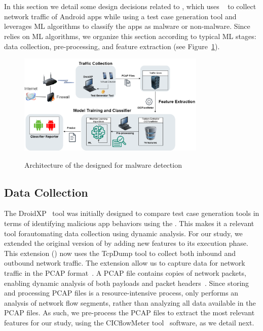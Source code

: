 \section{\droidxpflow}\label{sec:droidxpflow}

In this section we detail some design decisions
related to \droidxpflow, which uses \droidxp~\cite{DBLP:conf/scam/CostaMCMVBC20} to
collect network traffic of Android apps while
using a test case generation tool and leverages
ML algorithms to classify the
apps as malware or non-malware. Since \droidxpflow
relies on ML algorithms, we organize this section
according to typical ML stages: data collection,
pre-processing, and 
feature extraction (see Figure~\ref{fig:arq}).


\begin{figure}[h]
  \centering
  
    \includegraphics[width=0.80\textwidth]{image/archic.png} \\[\abovecaptionskip]
    
  \caption{Architecture of the \droidxpflow designed for malware detection}\label{fig:arq}
\end{figure}

\subsection{Data Collection}

The DroidXP~\cite{DBLP:conf/scam/CostaMCMVBC20} tool was initially designed to compare test case generation tools in terms of identifying malicious app behaviors using the \mas. This makes it a relevant tool forautomating data collection using dynamic analysis. For our study, we extended the original version of \droidxp by adding new features to its execution phase. This extension (\droidxpflow) now uses the TcpDump tool
to collect both inbound and outbound network traffic. The \droidxpflow extension allow us to capture data for network traffic in the PCAP format~\cite{DBLP:conf/iv/UhlarHR21}.
A PCAP file contains copies of network packets, enabling dynamic analysis of both payloads and packet headers~\cite{DBLP:conf/iv/UhlarHR21}. Since storing
and processing PCAP files is a resource-intensive process, \droidxpflow only performs an analysis of network flow segments, rather than analyzing all data available in the PCAP
files. As such, we pre-process the PCAP files to extract the most relevant features for our study, using the CICflowMeter tool~\cite{DBLP:conf/icissp/LashkariDMG17} software,
as we detail next.


